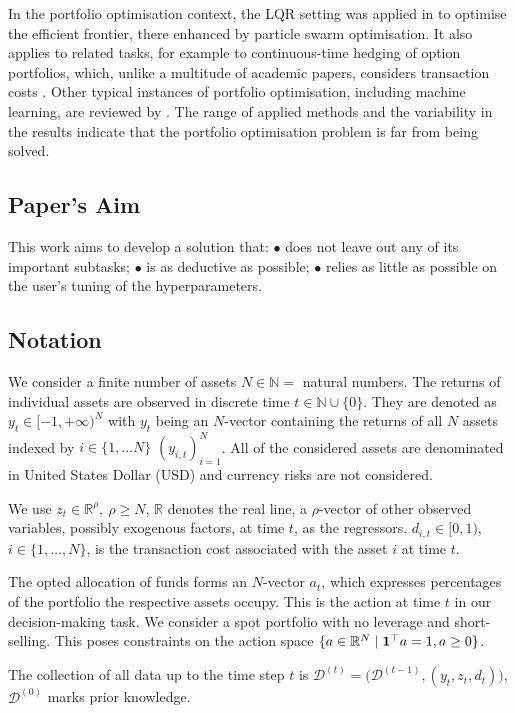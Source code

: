 In the portfolio optimisation context, the LQR setting was applied in \cite{cura2009particle} to optimise the efficient frontier, there enhanced by particle swarm optimisation. It also applies to related tasks, for example to continuous-time hedging of option portfolios, which, unlike a multitude of academic papers, considers transaction costs \cite{hedgingundertransactioncosts}. Other typical instances of portfolio optimisation, including machine learning, are reviewed by \cite{gunjan2023brief}. The range of applied methods and the variability in the results indicate that the portfolio optimisation problem is far from being solved.

\subsection*{Paper's Aim}
This work aims to develop a solution that: $\bullet$ does not leave out any of its important subtasks;  $\bullet$ is as deductive as possible; $\bullet$ relies as little as possible on the user's tuning of the hyperparameters.

\subsection*{Notation}  We consider a finite number of assets $N\in \mathbb{N} =$ natural numbers. The returns of individual assets are observed in discrete time $t\in \mathbb{N} \cup \{0\}$. They are denoted as  $y_{t}\in [-1,+\infty)^N$ with $y_{t}$ being an $N$-vector containing the returns of all $N$ assets indexed by $i\in\{1,\dots N\}$  $(y_{i,t})_{i=1}^N$. All of the considered assets are denominated in United States Dollar (USD) and currency risks are not considered.

We use $z_{t}\in \mathbb{R}^{\rho},\ \rho \geq N$, $\mathbb{R}$ denotes the real line, a $\rho$-vector of other observed variables, possibly exogenous factors, at time $t$, as the regressors. $d_{i,t}\in[0,1)$, $i\in\{1,\ldots,N\}$, is the transaction cost associated with the asset $i$ at time $t$.

The opted allocation of funds forms an $N$-vector $a_{t}$, which expresses percentages of the portfolio the respective assets occupy. This is the action at time $t$ in our decision-making task. We consider a spot portfolio with no leverage and short-selling. This poses constraints on the action space $ \{a\in\mathbb{R}^N\mid \mathbf{1}^{\top}a= 1, a\geq 0\}$.

The collection of all data up to the time step $t$ is $\mathcal{D}^{(t)} = \big(\mathcal{D}^{(t-1)},(y_{t}, z_{t}, d_{t})\big)$, $\mathcal{D}^{(0)}$ marks prior knowledge.

